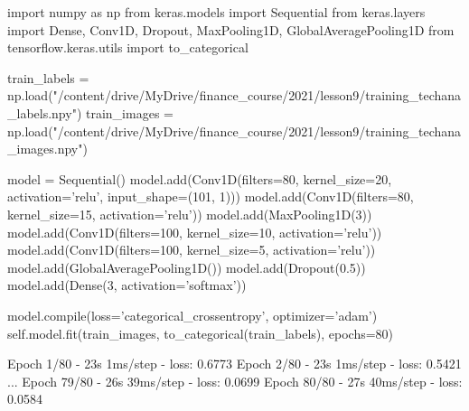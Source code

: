 \begin{ipython}
import numpy as np
from keras.models import Sequential
from keras.layers import Dense, Conv1D, Dropout, MaxPooling1D, GlobalAveragePooling1D
from tensorflow.keras.utils import to_categorical

train_labels = np.load("/content/drive/MyDrive/finance_course/2021/lesson9/training_techana_labels.npy")
train_images = np.load("/content/drive/MyDrive/finance_course/2021/lesson9/training_techana_images.npy")

model = Sequential()
model.add(Conv1D(filters=80, kernel_size=20, 
activation='relu', input_shape=(101, 1)))
model.add(Conv1D(filters=80, kernel_size=15, activation='relu')) 
model.add(MaxPooling1D(3))
model.add(Conv1D(filters=100, kernel_size=10, activation='relu'))
model.add(Conv1D(filters=100, kernel_size=5, activation='relu'))
model.add(GlobalAveragePooling1D())
model.add(Dropout(0.5))
model.add(Dense(3, activation='softmax'))

model.compile(loss='categorical_crossentropy', optimizer='adam')
self.model.fit(train_images, to_categorical(train_labels), epochs=80)
\end{ipython}
\begin{ioutput}
Epoch 1/80
- 23s 1ms/step - loss: 0.6773
Epoch 2/80
- 23s 1ms/step - loss: 0.5421
...
Epoch 79/80
- 26s 39ms/step - loss: 0.0699
Epoch 80/80
- 27s 40ms/step - loss: 0.0584
\end{ioutput}

